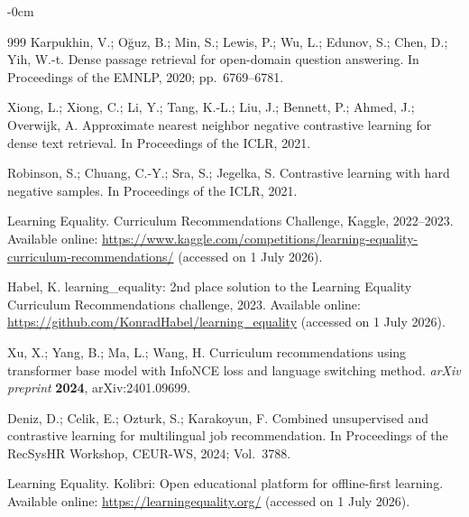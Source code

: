\documentclass[applsci,article,submit,pdftex,moreauthors]{Definitions/mdpi}
\begin{document}
\begin{adjustwidth}{-\extralength}{0cm}
\begin{thebibliography}{999}
Karpukhin, V.; O\u{g}uz, B.; Min, S.; Lewis, P.; Wu, L.; Edunov, S.; Chen, D.; Yih, W.-t. Dense passage retrieval for open-domain question answering. In Proceedings of the EMNLP, 2020; pp.\ 6769--6781.

Xiong, L.; Xiong, C.; Li, Y.; Tang, K.-L.; Liu, J.; Bennett, P.; Ahmed, J.; Overwijk, A. Approximate nearest neighbor negative contrastive learning for dense text retrieval. In Proceedings of the ICLR, 2021.

Robinson, S.; Chuang, C.-Y.; Sra, S.; Jegelka, S. Contrastive learning with hard negative samples. In Proceedings of the ICLR, 2021.

Learning Equality. Curriculum Recommendations Challenge, Kaggle, 2022--2023. Available online: \url{https://www.kaggle.com/competitions/learning-equality-curriculum-recommendations/} (accessed on 1 July 2026).

Habel, K. learning\_equality: 2nd place solution to the Learning Equality Curriculum Recommendations challenge, 2023. Available online: \url{https://github.com/KonradHabel/learning_equality} (accessed on 1 July 2026).

Xu, X.; Yang, B.; Ma, L.; Wang, H. Curriculum recommendations using transformer base model with InfoNCE loss and language switching method. \textit{arXiv preprint} \textbf{2024}, arXiv:2401.09699.

Deniz, D.; Celik, E.; Ozturk, S.; Karakoyun, F. Combined unsupervised and contrastive learning for multilingual job recommendation. In Proceedings of the RecSysHR Workshop, CEUR-WS, 2024; Vol.\ 3788.

Learning Equality. Kolibri: Open educational platform for offline-first learning. Available online: \url{https://learningequality.org/} (accessed on 1 July 2026).

\end{thebibliography}

\PublishersNote{}
\end{adjustwidth}
\end{document}
